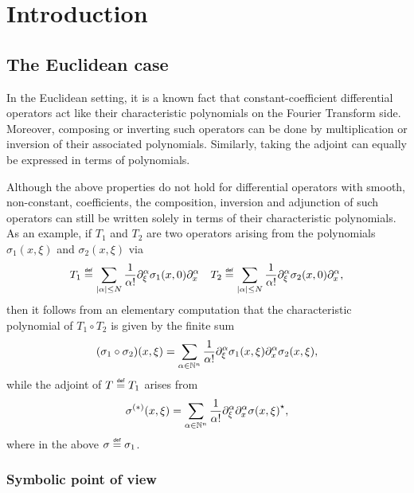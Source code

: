 \chapter{Introduction}

\section{The Euclidean case}

In the Euclidean setting,
it is a known fact that constant-coefficient differential operators act like their characteristic polynomials on the Fourier Transform side.
Moreover, composing or inverting such operators can be done by multiplication or inversion of their associated polynomials.
Similarly, taking the adjoint can equally be expressed in terms of polynomials.

Although the above properties do not hold for differential operators with smooth, non-constant, coefficients,
the composition, inversion and adjunction of such operators can still be written solely in terms of their characteristic polynomials.
As an example,
if $T_1$ and $T_2$ are two operators arising from the polynomials $\sigma_1(x, \xi)$ and $\sigma_2(x, \xi)$ via
\begin{align*}
    T_1 \defeq \sum_{\abs \alpha \leq N} \frac 1 {\alpha!} \iD{\xi^\alpha} \sigma_1(x, 0) \iD{x^\alpha}
    \quad
    T_2 \defeq \sum_{\abs \alpha \leq N} \frac 1 {\alpha!} \iD{\xi^\alpha} \sigma_2(x, 0) \iD{x^\alpha},
\end{align*}
then it follows from an elementary computation
that the characteristic polynomial of $T_1 \circ T_2$ is given by the finite sum
\begin{align}
    (\sigma_1 \circ \sigma_2)(x, \xi) = \sum_{\alpha \in \N^n} \frac 1 {\alpha!} \iD{\xi^\alpha} \sigma_1(x, \xi) \iD{x^\alpha} \sigma_2(x, \xi)
    \label{eq:composition_formula_for_characteristic_polynomials},
\end{align}
while the adjoint of $T \defeq T_1$ arises from
\begin{align}
    \sigma^{(*)}(x, \xi) = \sum_{\alpha \in \N^n} \frac 1 {\alpha!} \iD{\xi^\alpha} \iD{x^\alpha} \adj{\sigma(x, \xi)},
    \label{eq:adjunction_formula_for_characteristic_polynomials}
\end{align}
where in the above $\sigma \defeq \sigma_1$.

\subsection{Symbolic point of view}

